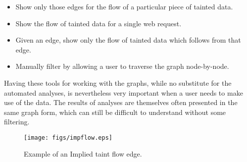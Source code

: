 \documentclass[msc,oneside]{ubcthesis}
\begin{document}
\begin{itemize}
\item Show only those edges for the flow of a particular piece of tainted data.
\item Show the flow of tainted data for a single web request.
\item Given an edge, show only the flow of tainted data which follows from that edge.
\item Manually filter by allowing a user to traverse the graph node-by-node.
\end{itemize}

Having these tools for working with the graphs, while no substitute for the automated analyses, is nevertheless very important when a user needs to make use of the data. The results of analyses are themselves often presented in the same graph form, which can still be difficult to understand without some filtering.

\begin{figure}[ht]
  \begin{center}
    \texttt{[image: figs/impflow.eps]}
    \caption[Example of an Implied taint flow edge.]{\label{fig:impflow} Example of an Implied taint flow edge.}
  \end{center}
\end{figure}
\end{document}
